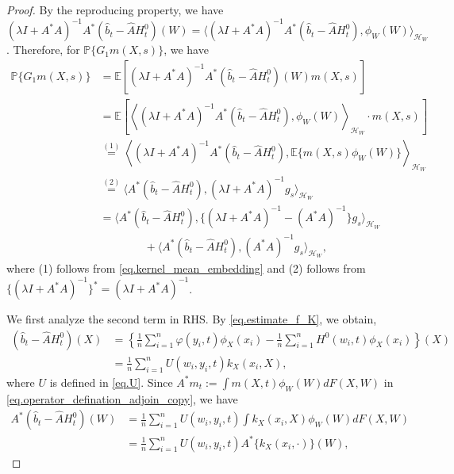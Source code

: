 \documentclass[
  12pt]{article}
\def\cH{\mathcal{H}}
\begin{document}
\begin{proof}
By the reproducing property, we have $(\lambda I+A^*A)^{-1}A^*(\widehat{b}_t-\widehat{A}H^0_t)(W)=\langle (\lambda I+A^*A)^{-1}A^*(\widehat{b}_t-\widehat{A}H^0_t),\phi_W(W)\rangle_{\cH_W}$. Therefore, for $\mathbb{P} \{G_1m(X,s)\}$, we have
\begin{equation}\label{eq.PG1-gs}
    \begin{aligned}
	\mathbb{P} \{G_1m(X,s)\} &=\mathbb{E} \left[ (\lambda I+A^*A)^{-1}A^*(\widehat{b}_t-\widehat{A}H^0_t)(W)m(X,s) \right]  \\
    &=\mathbb{E}\left[\left\langle (\lambda I+A^*A)^{-1}A^*(\widehat{b}_t-\widehat{A}H^0_t), \phi_W(W) \right\rangle_{\mathcal{H}_W}\cdot m(X,s)\right]  \\
	&\overset{(1)}{=} \left\langle (\lambda I+A^*A)^{-1}A^*(\widehat{b}_t-\widehat{A}H^0_t),\mathbb{E} \{ m(X,s)\phi_W(W)\} \right\rangle_{\mathcal{H}_W} \\
	&\overset{(2)}{=}\langle A^*(\widehat{b}_t-\widehat{A}H^0_t),(\lambda I+A^*A)^{-1}g_s \rangle_{\mathcal{H}_W}  \\
	&=\langle A^*(\widehat{b}_t-\widehat{A}H^0_t),\{ (\lambda I+A^*A)^{-1}-(A^*A)^{-1}\} g_s \rangle_{\mathcal{H}_W} \\
    & \qquad \qquad +\langle A^*(\widehat{b}_t-\widehat{A}H^0_t),(A^*A)^{-1}g_s \rangle_{\mathcal{H}_W},
\end{aligned}
\end{equation}
where (1) follows from \eqref{eq.kernel_mean_embedding} and (2) follows from $\{( \lambda I+A^*A )^{-1}\}^*=( \lambda I+A^*A )^{-1}$.

We first analyze the second term in RHS. By \eqref{eq.estimate_f_K}, we obtain,
\begin{align}
	(\widehat{b}_t-\widehat{A}H^0_t)(X)&=\left\{\frac{1}{n}\sum_{i=1}^n{\varphi (y_i,t) \phi_X(x_i)}-\frac{1}{n}\sum_{i=1}^n{H^0(w_i,t) \phi_X(x_i)}\right\}(X) \nonumber \\
	&=\frac{1}{n}\sum_{i=1}^n{U(w_i,y_i,t) k_X( x_i,X)}, \label{eq.bhat_residue}
\end{align}
where $U$ is defined in \eqref{eq.U}. Since $A^*m_t := \int m(X,t)\phi_W(W)dF(X,W)$ in \eqref{eq.operator_defination_adjoin_copy}, we have
\begin{align*}
	 A^*(\widehat{b}_t-\widehat{A}H^0_t)(W)&=\frac{1}{n}\sum_{i=1}^n{U(w_i,y_i,t) \int{k_X( x_i,X) \phi_W(W) dF(X,W)}}\\
	&=\frac{1}{n}\sum_{i=1}^n{U(w_i,y_i,t) A^*\{ k_X( x_i,\cdot)\}(W)}, 
\end{align*}


\end{proof}
\end{document}
